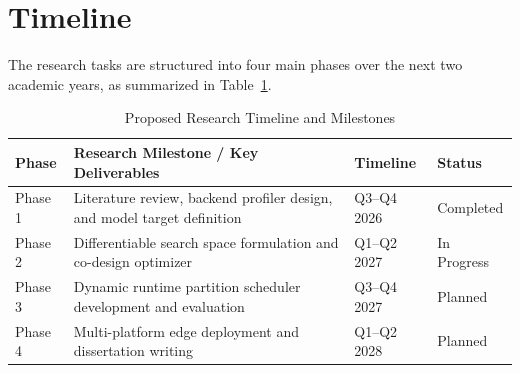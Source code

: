 \section{Timeline}
The research tasks are structured into four main phases over the next two academic years, as summarized in Table~\ref{tab:timeline}.

\begin{table}[htbp]
    \centering
    \caption{Proposed Research Timeline and Milestones}
    \label{tab:timeline}
    \vspace{0.2cm}
    \begin{tabularx}{\linewidth}{l X l l}
        \toprule
        \textbf{Phase} & \textbf{Research Milestone / Key Deliverables} & \textbf{Timeline} & \textbf{Status} \\
        \midrule
        Phase 1 & Literature review, backend profiler design, and model target definition & Q3--Q4 2026 & Completed \\
        Phase 2 & Differentiable search space formulation and co-design optimizer & Q1--Q2 2027 & In Progress \\
        Phase 3 & Dynamic runtime partition scheduler development and evaluation & Q3--Q4 2027 & Planned \\
        Phase 4 & Multi-platform edge deployment and dissertation writing & Q1--Q2 2028 & Planned \\
        \bottomrule
    \end{tabularx}
\end{table}
